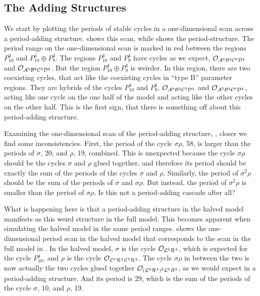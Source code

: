 \subsection{The Adding Structures}

We start by plotting the periods of stable cycles in a one-dimensional scan across a period-adding structure.
 shows this scan, while  shows the period-structure.
The period range on the one-dimensional scan is marked in red between the regions $P_{10}^4$ and $P_{10}^4 \oplus P_9^4$.
The regions $P_{10}^4$ and $P_9^4$ have cycles as we expect, $\mathcal{O}_{\mathcal{A}^6\mathcal{B}^4\mathcal{C}^6\mathcal{D}^4}$ and $\mathcal{O}_{\mathcal{A}^5\mathcal{B}^4\mathcal{C}^5\mathcal{D}^4}$.
But the region $P_{10}^4 \oplus P_9^4$ is weirder.
In this region, there are two coexisting cycles, that act like the coexisting cycles in ``type B'' parameter regions.
They are hybrids of the cycles $P_{10}^4$ and $P_9^4$, $\mathcal{O}_{\mathcal{A}^6\mathcal{B}^4\mathcal{C}^5\mathcal{D}^4}$ and $\mathcal{O}_{\mathcal{A}^5\mathcal{B}^4\mathcal{C}^6\mathcal{D}^4}$, acting like one cycle on the one half of the model and acting like the other cycles on the other half.
This is the first sign, that there is something off about this period-adding structure.

Examining the one-dimensional scan of the period-adding structure, , closer we find some inconsistencies.
First, the period of the cycle $\sigma\rho$, 58, is larger than the periods of $\sigma$, 20, and $\rho$, 19, combined.
This is unexpected because the cycle $\sigma\rho$ should be the cycles $\sigma$ and $\rho$ glued together, and therefore its period should be exactly the sum of the periods of the cycles $\sigma$ and $\rho$.
Similarly, the period of $\sigma^2\rho$ should be the sum of the periods of $\sigma$ and $\sigma\rho$.
But instead, the period of $\sigma^2\rho$ is smaller than the period of $\sigma\rho$.
Is this not a period-adding cascade after all?

What is happening here is that a period-adding structure in the halved model manifests as this weird structure in the full model.
This becomes apparent when simulating the halved model in the same period ranges.
 shows the one-dimensional period scan in the halved model that corresponds to the scan in the full model in .
In the halved model, $\sigma$ is the cycle $\mathcal{O}_{\mathcal{L}^6\mathcal{R}^4}$, which is expected for the cycle $P_{10}^4$, and $\rho$ is the cycle $\mathcal{O}_{\mathcal{L}^6\mathcal{R}^4\mathcal{L}^5\mathcal{R}^4}$.
The cycle $\sigma\rho$ in between the two is now actually the two cycles glued together $\mathcal{O}_{(\mathcal{L}^6\mathcal{R}^4)^2\mathcal{L}^5R^4}$, as we would expect in a period-adding structure.
And its period is 29, which is the sum of the periods of the cycle $\sigma$, 10, and $\rho$, 19.

